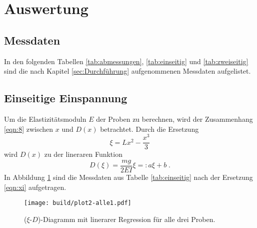 \section{Auswertung}
\label{sec:Auswertung}
\subsection{Messdaten}
\label{sec:mess}
In den folgenden Tabellen \ref{tab:abmessungen}, \ref{tab:einseitig} und \ref{tab:zweiseitig} sind die nach Kapitel
\ref{sec:Durchführung} aufgenommenen Messdaten aufgelistet.



\subsection{Einseitige Einspannung}
\label{sec:einseitig}
Um die Elastizitätsmoduln $E$ der Proben zu berechnen, wird der Zusammenhang \eqref{eqn:8} zwischen $x$ und $D(x)$ betrachtet. Durch die Ersetzung
\begin{equation}
    \xi=Lx^2-\frac{x^3}{3}
    \label{eqn:xi}
\end{equation}
wird $D(x)$ zu der lineraren Funktion
\begin{equation}
    D(\xi)=\frac{mg}{2EI}\xi=:a\xi+b \;.
    \label{eqn:D(xi)}
\end{equation}
In Abbildung \ref{fig:einseitig} sind die Messdaten aus Tabelle \ref{tab:einseitig} nach der Ersetzung \eqref{eqn:xi} aufgetragen.

\begin{figure}[H]
    \centering
    \texttt{[image: build/plot2-alle1.pdf]}
    \caption{($\xi$-$D$)-Diagramm mit linerarer Regression für alle drei Proben.}
    \label{fig:einseitig}
\end{figure}

